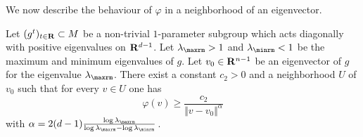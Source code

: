 We now describe the behaviour of $\varphi$ in a neighborhood of an eigenvector.

\begin{lemm}\label{H^1_lem2}
Let $(g^t)_{t\in {\bf R}} \subset M$ be a non-trivial $1$-parameter subgroup which acts diagonally with positive eigenvalues on ${\bf R} ^{d-1}$. Let $\lambda _{\maxrm} >1$ and $\lambda _{\minrm}<1$ be the maximum and minimum eigenvalues of $g$. Let $v_0 \in {\bf R} ^{n-1}$ be an eigenvector of $g$ for the eigenvalue $\lambda _{\maxrm}$. There exist a constant $c_2 > 0$ and a neighborhood $U$ of $v_0$ such that for every $v \in U$ one has
\[
\varphi (v) \geqslant \frac{c_2}{\Vert v-v_0 \Vert ^\alpha}
\]
with $\alpha = 2(d-1) \frac{\log \lambda _{\maxrm}}{\log \lambda _{\maxrm}- \log \lambda _{\minrm}}\,$.
\end{lemm}

